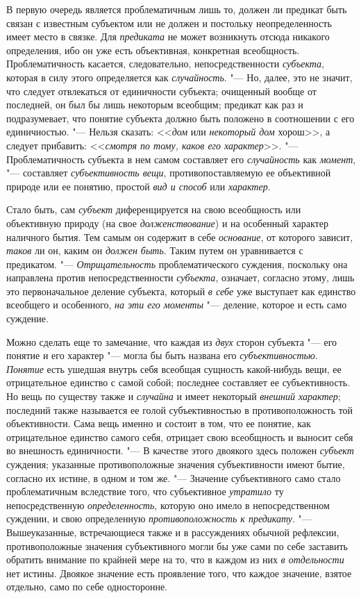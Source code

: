 \label{bkm:bm66a}В первую очередь является проблематичным лишь
то, должен ли предикат быть связан с известным субъектом или не должен и
постольку неопределенность имеет место в связке. Для
{\em предиката} не может
возникнуть отсюда никакого определения, ибо он уже есть объективная,
конкретная всеобщность. Проблематичность касается, следовательно,
непосредственности {\em субъекта},
которая в силу этого определяется как
{\em случайность}. "--- Но,
далее, это не значит, что следует отвлекаться от единичности субъекта;
очищенный вообще от последней, он был бы лишь некоторым всеобщим; предикат
как раз и подразумевает, что понятие субъекта должно быть положено в
соотношении с его единичностью. "--- Нельзя сказать:
<<{\em дом} или
{\em некоторый дом}
хорош>>, а следует прибавить:
<<{\em смотря по тому, каков его
характер}>>. "--- Проблематичность субъекта в нем самом
составляет его {\em случайность}
как {\em момент}, "---
составляет
{\em субъективность вещи},
противопоставляемую ее объективной природе или ее понятию,
простой {\em вид и способ}
или {\em характер}.

Стало быть, сам
{\em субъект}
диференцируется на свою всеобщность или объективную природу
(на свое {\em долженствование})
и на особенный характер наличного бытия. Тем самым он
содержит в себе {\em основание},
от которого зависит,
{\em таков} ли он, каким
он {\em должен быть}.
Таким путем он уравнивается с предикатом. "---
{\em Отрицательность}
проблематического суждения, поскольку она направлена против
непосредственности {\em субъекта},
означает, согласно этому, лишь это первоначальное деление
субъекта, который {\em в себе}
уже выступает как единство всеобщего и особенного,
{\em на эти его моменты}
"--- деление, которое и есть само суждение.

Можно сделать еще то замечание, что каждая из
{\em двух} сторон
субъекта "--- его понятие и его характер "--- могла
бы быть названа его
{\em субъективностью}.
\label{bkm:bm01a}{\em Понятие}
есть ушедшая внутрь себя всеобщая сущность какой-нибудь вещи,
ее отрицательное единство с самой собой; последнее составляет ее
субъективность. Но вещь по существу также и
{\em случайна} и имеет
некоторый {\em внешний характер};
последний также называется ее голой субъективностью в
противоположность той объективности. Сама вещь именно и состоит в том, что
ее понятие, как отрицательное единство самого себя, отрицает свою
всеобщность и выносит себя во внешность единичности. "--- В
качестве этого двоякого здесь положен
{\em субъект} суждения;
указанные противоположные значения субъективности имеют бытие, согласно их
истине, в одном и том же. "--- Значение субъективного само
стало проблематичным вследствие того, что субъективное
{\em утратило} ту
непосредственную {\em определенность},
которую оно имело в непосредственном суждении, и свою
определенную {\em противоположность к
предикату}. "--- Вышеуказанные, встречающиеся также и в
рассуждениях обычной рефлексии, противоположные значения субъективного
могли бы уже сами по себе заставить обратить внимание по крайней мере на
то, что в каждом из них {\em в
отдельности} нет истины. Двоякое значение есть проявление
того, что каждое значение, взятое отдельно, само по себе односторонне.

